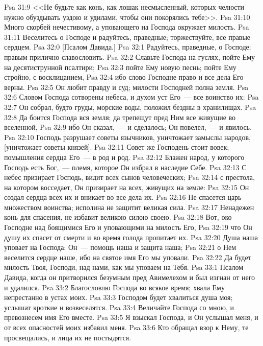 \vs Psa 31:9 <<Не будьте как конь, как лошак несмысленный, которых челюсти нужно обуздывать уздою и удилами, чтобы они покорялись тебе>>.
\vs Psa 31:10 Много скорбей нечестивому, а уповающего на Господа окружает милость.
\vs Psa 31:11 Веселитесь о Господе и радуйтесь, праведные; торжествуйте, все правые сердцем.
\vs Psa 32:0 [Псалом Давида.]
\rsbpar\vs Psa 32:1 Радуйтесь, праведные, о Господе: правым прилично славословить.
\vs Psa 32:2 Славьте Господа на гуслях, пойте Ему на десятиструнной псалтири;
\vs Psa 32:3 пойте Ему новую песнь; пойте Ему стройно, с восклицанием,
\vs Psa 32:4 ибо слово Господне право и все дела Его верны.
\vs Psa 32:5 Он любит правду и суд; милости Господней полна земля.
\vs Psa 32:6 Словом Господа сотворены небеса, и духом уст Его~--- все воинство их:
\vs Psa 32:7 Он собрал, будто груды, морские воды, положил бездны в хранилищах.
\vs Psa 32:8 Да боится Господа вся земля; да трепещут пред Ним все живущие во вселенной,
\vs Psa 32:9 ибо Он сказал,~--- и сделалось; Он повелел,~--- и явилось.
\vs Psa 32:10 Господь разрушает советы язычников, уничтожает замыслы народов, [уничтожает советы князей].
\vs Psa 32:11 Совет же Господень стоит вовек; помышления сердца Его~--- в род и род.
\vs Psa 32:12 Блажен народ, у которого Господь есть Бог,~--- племя, которое Он избрал в наследие Себе.
\vs Psa 32:13 С небес призирает Господь, видит всех сынов человеческих;
\vs Psa 32:14 с престола, на котором восседает, Он призирает на всех, живущих на земле:
\vs Psa 32:15 Он создал сердца всех их и вникает во все дела их.
\vs Psa 32:16 Не спасется царь множеством воинства; исполина не защитит великая сила.
\vs Psa 32:17 Ненадежен конь для спасения, не избавит великою силою своею.
\vs Psa 32:18 Вот, око Господне над боящимися Его и уповающими на милость Его,
\vs Psa 32:19 что Он душу их спасет от смерти и во время голода пропитает их.
\vs Psa 32:20 Душа наша уповает на Господа: Он~--- помощь наша и защита наша;
\vs Psa 32:21 о Нем веселится сердце наше, ибо на святое имя Его мы уповали.
\vs Psa 32:22 Да будет милость Твоя, Господи, над нами, как мы уповаем на Тебя.
\vs Psa 33:1 Псалом Давида, когда он притворился безумным пред Авимелехом и был изгнан от него и удалился.
\rsbpar\vs Psa 33:2 Благословлю Господа во всякое время; хвала Ему непрестанно в устах моих.
\vs Psa 33:3 Господом будет хвалиться душа моя; услышат кроткие и возвеселятся.
\vs Psa 33:4 Величайте Господа со мною, и превознесем имя Его вместе.
\vs Psa 33:5 Я взыскал Господа, и Он услышал меня, и от всех опасностей моих избавил меня.
\vs Psa 33:6 Кто обращал взор к Нему, те просвещались, и лица их не постыдятся.
